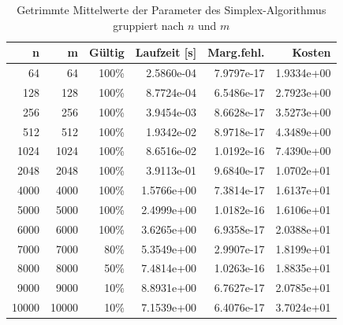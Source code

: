 \begin{table}[htbp]
\caption{Getrimmte Mittelwerte der Parameter des Simplex-Algorithmus gruppiert nach $n$ und $m$}
\label{tab:Simplextest}
\small
\centering
{}
\begin{tabular}{rrrrrr}
\toprule
n & m & Gültig & Laufzeit [s] & Marg.fehl. & Kosten \\
\midrule
64 & 64 & 100\% & 2.5860e-04 & 7.9797e-17 & 1.9334e+00 \\
128 & 128 & 100\% & 8.7724e-04 & 6.5486e-17 & 2.7923e+00 \\
256 & 256 & 100\% & 3.9454e-03 & 8.6628e-17 & 3.5273e+00 \\
512 & 512 & 100\% & 1.9342e-02 & 8.9718e-17 & 4.3489e+00 \\
1024 & 1024 & 100\% & 8.6516e-02 & 1.0192e-16 & 7.4390e+00 \\
2048 & 2048 & 100\% & 3.9113e-01 & 9.6840e-17 & 1.0702e+01 \\
4000 & 4000 & 100\% & 1.5766e+00 & 7.3814e-17 & 1.6137e+01 \\
5000 & 5000 & 100\% & 2.4999e+00 & 1.0182e-16 & 1.6106e+01 \\
6000 & 6000 & 100\% & 3.6265e+00 & 6.9358e-17 & 2.0388e+01 \\
7000 & 7000 & 80\% & 5.3549e+00 & 2.9907e-17 & 1.8199e+01 \\
8000 & 8000 & 50\% & 7.4814e+00 & 1.0263e-16 & 1.8835e+01 \\
9000 & 9000 & 10\% & 8.8931e+00 & 6.7627e-17 & 2.0785e+01 \\
10000 & 10000 & 10\% & 7.1539e+00 & 6.4076e-17 & 3.7024e+01 \\
\bottomrule
\end{tabular}
\end{table}
